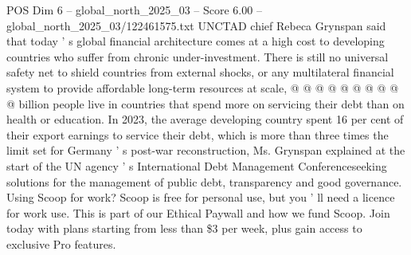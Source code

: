 \begin{textsample}{POS Dim 6 – global\_north\_2025\_03 – Score 6.00 – global\_north\_2025\_03/122461575.txt}
UNCTAD chief Rebeca Grynspan said that today ' s global financial architecture comes at a high cost to developing countries who suffer from chronic under-investment.
There is still no universal safety net to shield countries from external shocks, or any multilateral financial system to provide affordable long-term resources at scale, @ @ @ @ @ @ @ @ @ @ billion people live in countries that spend more on servicing their debt than on health or education.
In 2023, the average developing country spent 16 per cent of their export earnings to service their debt, which is more than three times the limit set for Germany ' s post-war reconstruction, Ms.
Grynspan explained at the start of the UN agency ' s International Debt Management Conferenceseeking solutions for the management of public debt, transparency and good governance.
Using Scoop for work?
Scoop is free for personal use, but you ' ll need a licence for work use.
This is part of our Ethical Paywall and how we fund Scoop.
Join today with plans starting from less than \$3 per week, plus gain access to exclusive Pro features.

\end{textsample}
